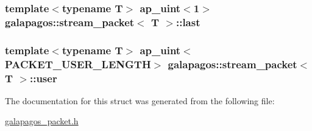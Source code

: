 \subsubsection[{\texorpdfstring{last}{last}}]{\setlength{\rightskip}{0pt plus 5cm}template$<$typename T$>$ ap\+\_\+uint$<$1$>$ {\bf galapagos\+::stream\+\_\+packet}$<$ {\bf T} $>$\+::last}\hypertarget{structgalapagos_1_1stream__packet_ac24df7348558cf3c41f925ca06d47df6}{}\label{structgalapagos_1_1stream__packet_ac24df7348558cf3c41f925ca06d47df6}
\subsubsection[{\texorpdfstring{user}{user}}]{\setlength{\rightskip}{0pt plus 5cm}template$<$typename T$>$ ap\+\_\+uint$<${\bf P\+A\+C\+K\+E\+T\+\_\+\+U\+S\+E\+R\+\_\+\+L\+E\+N\+G\+TH}$>$ {\bf galapagos\+::stream\+\_\+packet}$<$ {\bf T} $>$\+::user}\hypertarget{structgalapagos_1_1stream__packet_a2907d53b45fb3a8d84f3dc5258994e96}{}\label{structgalapagos_1_1stream__packet_a2907d53b45fb3a8d84f3dc5258994e96}


The documentation for this struct was generated from the following file\+:\begin{DoxyCompactItemize}
\item 
\hyperlink{galapagos__packet_8h}{galapagos\+\_\+packet.\+h}\end{DoxyCompactItemize}
